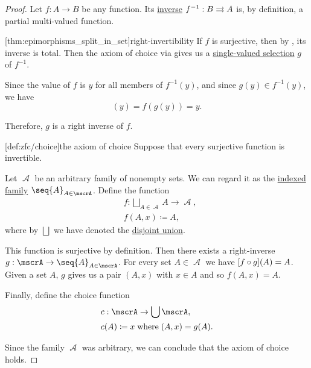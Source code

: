 \begin{proof}
  Let \( f: A \to B \) be any function. Its \hyperref[def:multi_valued_function/inverse]{inverse} \( f^{-1}: B \rightrightarrows A \) is, by definition, a partial multi-valued function.

  [thm:epimorphisms_split_in_set]{right-invertibility} If \( f \) is surjective, then by , its inverse is total. Then the axiom of choice via  gives us a \hyperref[def:function/selection]{single-valued selection} \( g \) of \( f^{-1} \).

  Since the value of \( f \) is \( y \) for all members of \( f^{-1}(y) \), and since \( g(y) \in f^{-1}(y) \), we have
  \begin{equation*}
    [f \bincirc g](y) = f(g(y)) = y.
  \end{equation*}

  Therefore, \( g \) is a right inverse of \( f \).

  [def:zfc/choice]{the axiom of choice} Suppose that every surjective function is invertible.

  Let \( \mscrA \) be an arbitrary family of nonempty sets. We can regard it as the \hyperref[def:tuple_and_cartesian_product/indexed_family]{indexed family} \( \seq{ A }_{A \in \mscrA} \). Define the function
  \begin{equation*}
    \begin{aligned}
      &f: \bigsqcup_{A \in \mscrA} A \to \mscrA, \\
      &f(A, x) \coloneqq A,
    \end{aligned}
  \end{equation*}
  where by \( \bigsqcup \) we have denoted the \hyperref[def:disjoint_union]{disjoint union}.

  This function is surjective by definition. Then there exists a right-inverse \( g: \mscrA \to \seq{ A }_{A \in \mscrA} \). For every set \( A \in \mscrA \) we have \( [f \mathbin \circ g](A) = A \). Given a set \( A \), \( g \) gives us a pair \( (A, x) \) with \( x \in A \) and so \( f(A, x) = A \).

  Finally, define the choice function
  \begin{equation*}
    \begin{aligned}
      &c: \mscrA \to \bigcup \mscrA, \\
      &c(A) \coloneqq x \T{where} (A, x) = g(A).
    \end{aligned}
  \end{equation*}

  Since the family \( \mscrA \) was arbitrary, we can conclude that the axiom of choice holds.
\end{proof}


